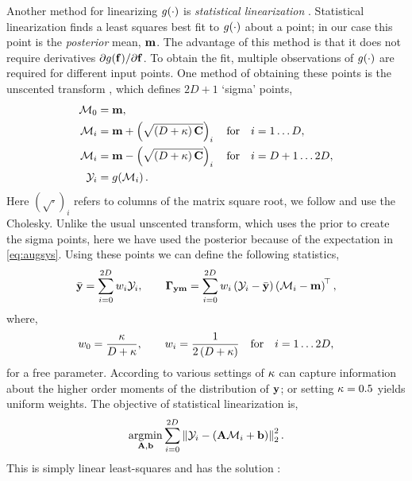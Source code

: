 \documentclass{article} %
\begin{document}
Another method for linearizing $\nonlin{\cdot}$ is \emph{statistical
    linearization} \cite{Geist2010}. Statistical linearization finds a least
squares best fit to $\nonlin{\cdot}$ about a point; in our case this point is
the \emph{posterior} mean, $\pomean$. The advantage of this method is that it
does not require derivatives $\partial\nonlin{\lstate}\!/\partial\lstate$. To
obtain the fit, multiple observations of $\nonlin{\cdot}$ are required for
different input points. One method of obtaining these points is the unscented
transform \cite{Julier2004}, which defines $2D+1$ `sigma' points,
\begin{align}
    \Sfunc_0 &= \pomean,
        \label{eq:spoint0} \\
    \Sfunc_i &= \pomean + \brac{\sqrt{\brac{D + \scoef} \pocov}}_i \quad
        \text{for} \quad i = 1 \ldots D, \\
    \Sfunc_i &= \pomean - \brac{\sqrt{\brac{D + \scoef} \pocov}}_i \quad
        \text{for} \quad i = D+1 \ldots 2D,
        \label{eq:spointi} \\
    \Sobs_i &= \nonlin{\Sfunc_i}.
\end{align}
Here $(\sqrt{\cdot})_i$ refers to columns of the matrix square root, we follow
\cite{Julier2004} and use the Cholesky. Unlike the usual unscented transform,
which uses the prior to create the sigma points, here we have used the
posterior because of the expectation in \eqref{eq:augsys}. Using these points
we can define the following statistics,
\begin{equation}
    \bar\obs = \sum^{2D}_{i=0} \Sw_i \Sobs_i,
    \qquad
    \xcov = \sum^{2D}_{i=0} \Sw_i \brac{\Sobs_i - \bar\obs}
        \brac{\Sfunc_i - \pomean}\transpose,
    \label{eq:slstats}
\end{equation}
where,
\begin{equation}
    \Sw_0 = \frac{\scoef}{D + \scoef},
        \qquad \Sw_i = \frac{1}{2\brac{D + \scoef}}
        \quad \text{for} \quad i = 1 \ldots 2D,
    \label{eq:slweights}
\end{equation}
for a free parameter. According to \cite{Julier2004} various settings of
$\scoef$ can capture information about the higher order moments of the
distribution of $\obs$; or setting $\scoef = 0.5$ yields uniform weights. The
objective of statistical linearization is,
\begin{equation}
    \argmin_{\Linmat, \intcpt} \sum^{2D}_{i=0} 
        \lnorm{2}{\Sobs_i - \brac{\Linmat\Sfunc_i + \intcpt}}^2.
\end{equation}
This is simply linear least-squares and has the solution \cite{Geist2010}:
\end{document}
